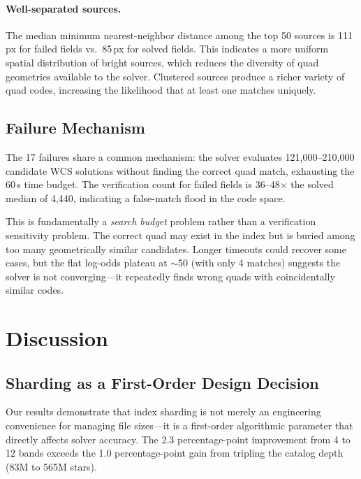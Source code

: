 \documentclass[twocolumn, 10pt]{article}
\begin{document}
\paragraph{Well-separated sources.}
The median minimum nearest-neighbor distance among the top 50 sources
is 111\,px for failed fields vs.\ 85\,px for solved fields. This
indicates a more uniform spatial distribution of bright sources, which
reduces the diversity of quad geometries available to the solver.
Clustered sources produce a richer variety of quad codes, increasing
the likelihood that at least one matches uniquely.

\subsection{Failure Mechanism} \label{sec:mechanism}

The 17 failures share a common mechanism: the solver evaluates
121{,}000--210{,}000 candidate WCS solutions without finding the
correct quad match, exhausting the 60\,s time budget. The
verification count for failed fields is 36--48$\times$ the solved
median of 4{,}440, indicating a false-match flood in the code space.

This is fundamentally a \emph{search budget} problem rather than a
verification sensitivity problem. The correct quad may exist in the
index but is buried among too many geometrically similar candidates.
Longer timeouts could recover some cases, but the flat log-odds
plateau at $\sim$50 (with only 4 matches) suggests the solver is not
converging---it repeatedly finds wrong quads with coincidentally
similar codes.

\section{Discussion} \label{sec:discussion}

\subsection{Sharding as a First-Order Design Decision}

Our results demonstrate that index sharding is not merely an engineering
convenience for managing file sizes---it is a first-order algorithmic
parameter that directly affects solver accuracy. The 2.3 percentage-point
improvement from 4 to 12 bands exceeds the 1.0 percentage-point gain
from tripling the catalog depth (83M to 565M stars).
\end{document}
